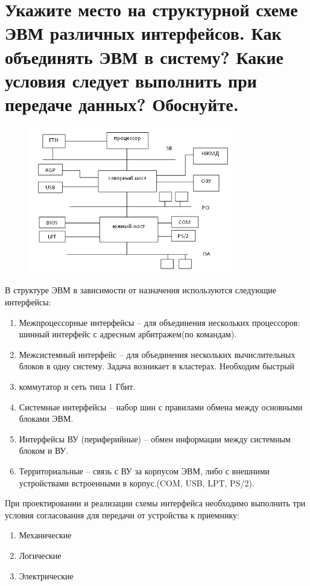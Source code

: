 \documentclass[unicode, 12pt, a4paper, oneside]{article}
\begin{document}
\section{Укажите место на структурной схеме ЭВМ различных интерфейсов. Как объединять ЭВМ в  систему? Какие условия следует выполнить при  передаче данных? Обоснуйте.}

\begin{figure}[H]
\centering
\includegraphics[width=0.8\textwidth]{./images/102_interface.png}
\end{figure}

В структуре ЭВМ в зависимости от назначения используются следующие интерфейсы:
\begin{enumerate}
\item Межпроцессорные интерфейсы – для объединения нескольких процессоров: шинный интерфейс с адресным арбитражем(по командам).
\item Межсистемный интерфейс – для объединения нескольких вычислительных блоков в одну систему. Задача возникает в кластерах. Необходим быстрый \item коммутатор и сеть типа 1 Гбит.
\item Системные интерфейсы – набор шин с правилами обмена между основными блоками ЭВМ.
\item Интерфейсы ВУ (периферийные) – обмен информации между системным блоком и ВУ.
\item Территориальные – связь с ВУ за корпусом ЭВМ, либо с внешними устройствами встроенными в корпус.(COM, USB, LPT, PS/2).
\end{enumerate}

При проектировании и реализации схемы интерфейса необходимо выполнить три условия согласования для передачи от устройства к приемнику:
\begin{enumerate}
\item Механические
\item Логические
\item Электрические
\end{enumerate}
\end{document}
